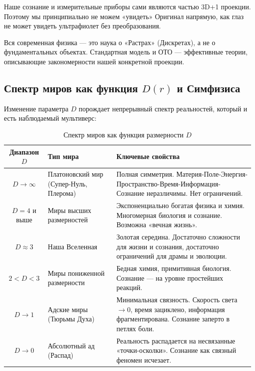 \documentclass[a4paper,12pt]{article}
\begin{document}
Наше сознание и измерительные приборы сами являются частью 3D+1 проекции. Поэтому мы принципиально не можем «увидеть» Оригинал напрямую, как глаз не может увидеть ультрафиолет без преобразования.

Вся современная физика — это наука о «Растрах» (Дискретах), а не о фундаментальных объектах. Стандартная модель и ОТО — эффективные теории, описывающие закономерности нашей конкретной проекции.

\subsection{Спектр миров как функция $D(r)$ и Симфизиса}

Изменение параметра $D$ порождает непрерывный спектр реальностей, который и есть наблюдаемый мультиверс:

\begin{table}[H]
	\centering
	\begin{tabular}{|c|p{3.5cm}|p{8.5cm}|}
		\hline
		\textbf{Диапазон $D$} & \textbf{Тип мира} & \textbf{Ключевые свойства} \\
		\hline
		$D \to \infty$ & Платоновский мир (Супер-Нуль, Плерома) & Полная симметрия. Материя-Поле-Энергия-Пространство-Время-Информация-Сознание неразличимы. Нет ограничений. \\
		\hline
		$D = 4$ и выше & Миры высших размерностей & Экспоненциально богатая физика и химия. Многомерная биология и сознание. Возможна «вечная жизнь». \\
		\hline
		$D \approx 3$ & Наша Вселенная & Золотая середина. Достаточно сложности для жизни и сознания, достаточно ограничений для драмы и эволюции. \\
		\hline
		$2 < D < 3$ & Миры пониженной размерности & Бедная химия, примитивная биология. Сознание — на уровне простейших реакций. \\
		\hline
		$D \to 1$ & Адские миры (Тюрьмы Духа) & Минимальная связность. Скорость света $\to 0$, время зациклено, информация фрагментирована. Сознание заперто в петлях боли. \\
		\hline
		$D \to 0$ & Абсолютный ад (Распад) & Реальность распадается на несвязанные «точки-осколки». Сознание как связный феномен исчезает. \\
		\hline
	\end{tabular}
	\caption{Спектр миров как функция размерности $D$}
\end{table}
\end{document}
